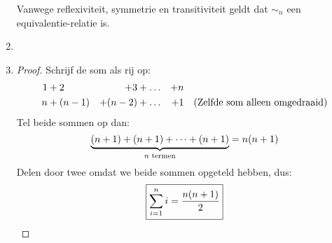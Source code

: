 \documentclass{article}
\begin{document}
\begin{enumerate}[label=\alph*)]
\begin{enumerate}[label=\arabic*.]
          \end{enumerate}
          Vanwege reflexiviteit, symmetrie en transitiviteit geldt dat $\sim_n$ een equivalentie-relatie is.
    \item
    \item
          \begin{proof}
              Schrijf de som als rij op:
              \begin{align*}
                  1 & + 2     & + 3     & + \dots & + n &                                           \\
                  n & + (n-1) & + (n-2) & + \dots & + 1 & \quad (\text{Zelfde som alleen omgedraaid})
              \end{align*}
              Tel beide sommen op dan:
              \[\underbrace{(n+1) + (n+1) + \dots + (n+1)}_{n \text{ termen}} = n(n+1)\]
              Delen door twee omdat we beide sommen opgeteld hebben, dus:
              \[\boxed{\sum_{i=1}^{n} i = \frac{n(n+1)}{2}}\]
          \end{proof}
\end{enumerate}
\end{document}
